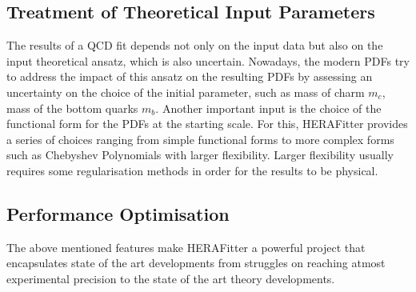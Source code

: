 \subsection{Treatment of Theoretical Input Parameters}

The results of a QCD fit depends not only on the input data but also on the 
input theoretical ansatz, which is also uncertain. Nowadays, the modern PDFs 
try to address the impact of this ansatz on the resulting PDFs by assessing an 
uncertainty on the choice of the initial parameter, such as mass of charm $m_c$, mass of the bottom quarks $m_b$. Another important input is the choice of the functional form for the PDFs at the starting scale. 
For this, HERAFitter provides a series of choices ranging from simple functional forms to more complex forms such as Chebyshev Polynomials with larger flexibility. Larger flexibility usually requires some regularisation methods in order for the results to be physical.




\subsection{Performance Optimisation}

The above mentioned features make HERAFitter a powerful project that encapsulates state of the art developments from struggles on reaching atmost experimental precision to the state of the art theory developments. 



